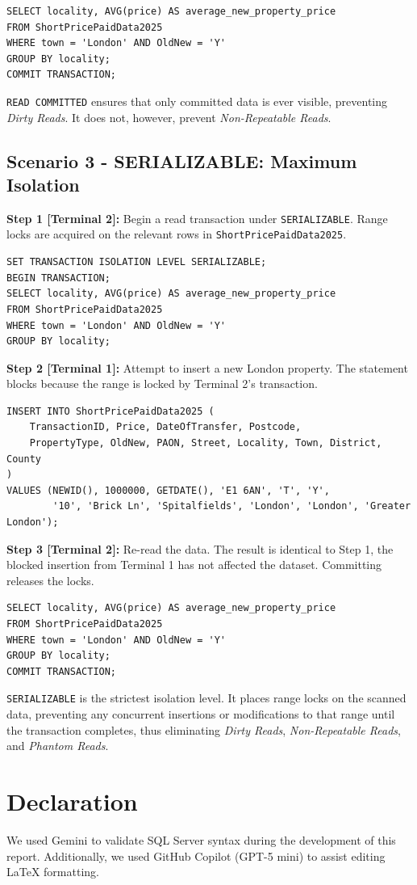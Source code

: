 \documentclass[a4paper,11pt]{article}
\begin{document}
\begin{lstlisting}
SELECT locality, AVG(price) AS average_new_property_price
FROM ShortPricePaidData2025
WHERE town = 'London' AND OldNew = 'Y'
GROUP BY locality;
COMMIT TRANSACTION;
\end{lstlisting}

\texttt{READ COMMITTED} ensures that only committed data is ever visible, preventing \textit{Dirty Reads}. It does not, however, prevent \textit{Non-Repeatable Reads}.

\subsection{Scenario 3 - SERIALIZABLE: Maximum Isolation}

\textbf{Step 1 [Terminal 2]:} Begin a read transaction under \texttt{SERIALIZABLE}. Range locks are acquired on the relevant rows in \texttt{ShortPricePaidData2025}.

\begin{lstlisting}
SET TRANSACTION ISOLATION LEVEL SERIALIZABLE;
BEGIN TRANSACTION;
SELECT locality, AVG(price) AS average_new_property_price
FROM ShortPricePaidData2025
WHERE town = 'London' AND OldNew = 'Y'
GROUP BY locality;
\end{lstlisting}

\textbf{Step 2 [Terminal 1]:} Attempt to insert a new London property. The statement blocks because the range is locked by Terminal 2's transaction.

\begin{lstlisting}
INSERT INTO ShortPricePaidData2025 (
    TransactionID, Price, DateOfTransfer, Postcode,
    PropertyType, OldNew, PAON, Street, Locality, Town, District, County
)
VALUES (NEWID(), 1000000, GETDATE(), 'E1 6AN', 'T', 'Y',
        '10', 'Brick Ln', 'Spitalfields', 'London', 'London', 'Greater London');
\end{lstlisting}

\textbf{Step 3 [Terminal 2]:} Re-read the data. The result is identical to Step 1, the blocked insertion from Terminal 1 has not affected the dataset. Committing releases the locks.

\begin{lstlisting}
SELECT locality, AVG(price) AS average_new_property_price
FROM ShortPricePaidData2025
WHERE town = 'London' AND OldNew = 'Y'
GROUP BY locality;
COMMIT TRANSACTION;
\end{lstlisting}

\texttt{SERIALIZABLE} is the strictest isolation level. It places range locks on the scanned data, preventing any concurrent insertions or modifications to that range until the transaction completes, thus eliminating \textit{Dirty Reads}, \textit{Non-Repeatable Reads}, and \textit{Phantom Reads}.

\section*{Declaration}
We used Gemini to validate SQL Server syntax during the development of this report. Additionally, we used GitHub Copilot (GPT-5 mini) to assist editing LaTeX formatting.
\end{document}
